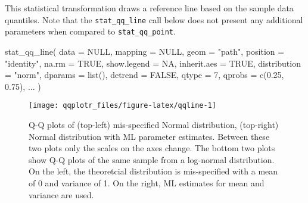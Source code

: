 This statistical transformation draws a reference line based on the
sample data quantiles. Note that the \texttt{stat\_qq\_line} call below
does not present any additional parameters when compared to
\texttt{stat\_qq\_point}.

\begin{Schunk}
\begin{Sinput}
stat_qq_line(
  data = NULL,
  mapping = NULL,
  geom = "path",
  position = "identity",
  na.rm = TRUE,
  show.legend = NA,
  inherit.aes = TRUE,
  distribution = "norm",
  dparams = list(),
  detrend = FALSE,
  qtype = 7,
  qprobs = c(0.25, 0.75),
  ...
  )
\end{Sinput}
\end{Schunk}


\begin{Schunk}
\begin{figure}
\texttt{[image: qqplotr\_files/figure-latex/qqline-1]} \caption[Q-Q plots of (top-left) mis-specified Normal distribution, (top-right)  Normal distribution with ML parameter estimates]{Q-Q plots of (top-left) mis-specified Normal distribution, (top-right)  Normal distribution with ML parameter estimates. Between these two plots only the scales on the axes change. The bottom two plots show Q-Q plots of the same sample from a log-normal distribution. On the left, the theoretcial distribution is mis-specified with a mean of 0 and variance of 1. On the right, ML estimates for mean and variance are used.}\label{fig:qqline}
\end{figure}
\end{Schunk}

